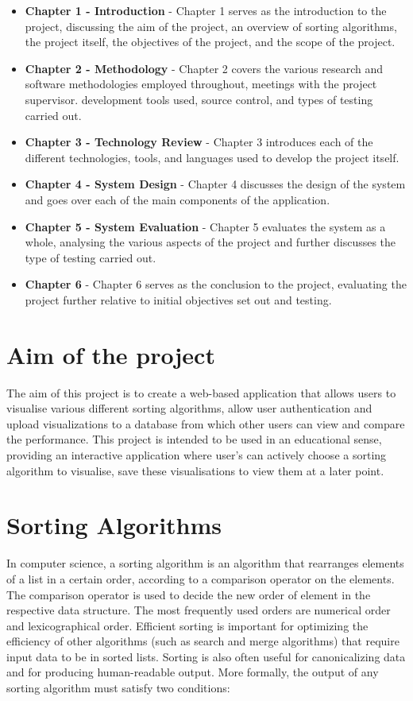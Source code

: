 \begin{itemize}
    \item \textbf{Chapter 1 - Introduction} - Chapter 1 serves as the introduction to the project, discussing the aim of the project, an overview of sorting algorithms, the project itself, the objectives of the project, and the scope of the project.
    \item \textbf{Chapter 2 - Methodology} - Chapter 2 covers the various research and software methodologies employed throughout, meetings with the project supervisor. development tools used, source control, and types of testing carried out.
    \item \textbf{Chapter 3 - Technology Review} - Chapter 3 introduces each of the different technologies, tools, and languages used to develop the project itself.
    \item \textbf{Chapter 4 - System Design} - Chapter 4 discusses the design of the system and goes over each of the main components of the application.
    \item \textbf{Chapter 5 - System Evaluation} - Chapter 5 evaluates the system as a whole, analysing the various aspects of the project and further discusses the type of testing carried out.
    \item \textbf{Chapter 6} - Chapter 6 serves as the conclusion to the project, evaluating the project further relative to initial objectives set out and testing.
\end{itemize}

\section{Aim of the project}
The aim of this project is to create a web-based application that allows users to
visualise various different sorting algorithms, allow user authentication and 
upload visualizations to a database from which other users can view and compare
the performance. This project is intended to be used in an educational sense,
providing an interactive application where user's can actively choose a sorting
algorithm to visualise, save these visualisations to view them at a later point.

\section{Sorting Algorithms}
In computer science, a sorting algorithm is an algorithm that rearranges 
elements of a list in a certain order, according to a comparison operator on the
elements. The comparison operator is used to decide the new order of element in the respective data structure. The most frequently used orders are numerical order and lexicographical order. Efficient sorting is important for optimizing the efficiency of other algorithms (such as search and merge algorithms) that require input data to be in sorted lists. Sorting is also often useful for canonicalizing data and for producing human-readable output. More formally, the output of any sorting algorithm must satisfy two conditions:

